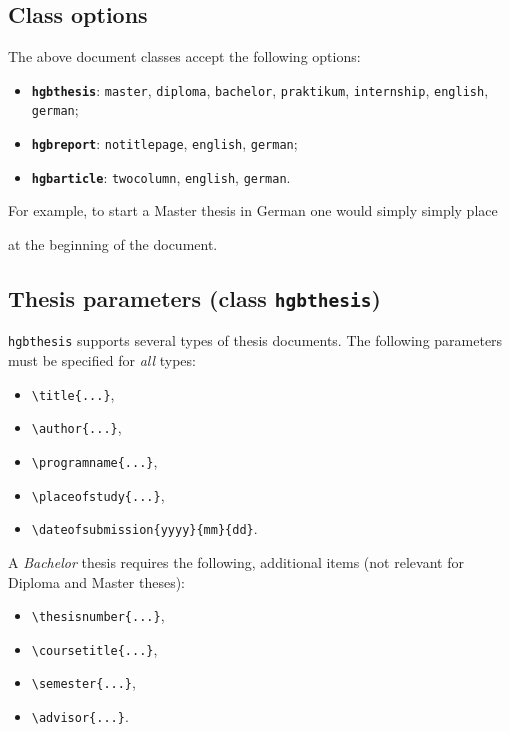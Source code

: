 \documentclass[english]{hgbarticle}
\begin{document}
\subsection{Class options} 
The above document classes accept the following options:
%
\begin{raggedright}
\begin{itemize}
\item \textbf{\texttt{hgbthesis}}: 
	\texttt{master}, \texttt{diploma}, \texttt{bachelor}, \texttt{praktikum}, 
	\texttt{internship}, \texttt{english}, \texttt{german};
\item \textbf{\texttt{hgbreport}}: \texttt{notitlepage}, \texttt{english}, \texttt{german};
\item \textbf{\texttt{hgbarticle}}: \texttt{twocolumn}, \texttt{english}, \texttt{german}.
\end{itemize}
\end{raggedright}
%
For example, to start a Master thesis in German
one would simply simply place
%
%
at the beginning of the document.



\subsection{Thesis parameters (class \texttt{hgbthesis})}

\texttt{hgbthesis} supports several types of thesis documents.
The following parameters must be specified for \emph{all} types:
%
\begin{itemize}
\item \verb!\title{...}!,
\item \verb!\author{...}!,
\item \verb!!,
\item \verb!!,
\item \verb!!.
\end{itemize}
%
\noindent A \emph{Bachelor} thesis requires the following, additional items 
(not relevant for Diploma and Master theses):
%
\begin{itemize}
\item \verb!!,
\item \verb!!,
\item \verb!!,
\item \verb!!.
\end{itemize}
\end{document}
